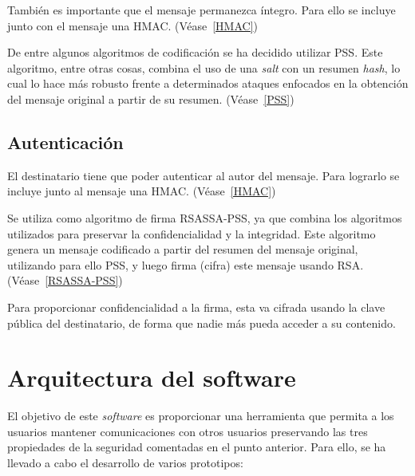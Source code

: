 También es importante que el mensaje permanezca íntegro. Para ello se incluye junto con el mensaje una HMAC. (Véase~\ref{HMAC})

De entre algunos algoritmos de codificación se ha decidido utilizar PSS. Este algoritmo, entre otras cosas, combina el uso de una \emph{salt} con un resumen \emph{hash}, lo cual lo hace más robusto frente a determinados ataques enfocados en la obtención del mensaje original a partir de su resumen. (Véase~\ref{PSS})

\subsection{Autenticación}

El destinatario tiene que poder autenticar al autor del mensaje. Para lograrlo se incluye junto al mensaje una HMAC. (Véase~\ref{HMAC})

Se utiliza como algoritmo de firma RSASSA-PSS, ya que combina los algoritmos utilizados para preservar la confidencialidad y la integridad. Este algoritmo genera un mensaje codificado a partir del resumen del mensaje original, utilizando para ello PSS, y luego firma (cifra) este mensaje usando RSA. (Véase~\ref{RSASSA-PSS})

Para proporcionar confidencialidad a la firma, esta va cifrada usando la clave pública del destinatario, de forma que nadie más pueda acceder a su contenido.


\section{Arquitectura del software}

\label{Chapter4.2}

El objetivo de este \emph{software} es proporcionar una herramienta que permita a los usuarios mantener comunicaciones con otros usuarios preservando las tres propiedades de la seguridad comentadas en el punto anterior. Para ello, se ha llevado a cabo el desarrollo de varios prototipos:

